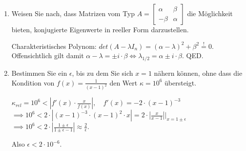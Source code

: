 \documentclass[12pt]{article}
\begin{document}
\begin{enumerate}
	\item Weisen Sie nach, dass Matrizen vom Typ $A = \begin{bmatrix} \alpha & \beta \\ -\beta & \alpha \end{bmatrix}$ die  Möglichkeit bieten, konjugierte Eigenwerte in reeller Form darzustellen.
	
	\begin{solution}
		Charakteristisches Polynom: $det(A-\lambda I_n) = (\alpha - \lambda)^2 +\beta^2 \stackrel{!}{=} 0$.\\
		Offensichtlich gilt damit $\alpha-\lambda = \pm i\cdot \beta \iff \lambda_{1/2} = \alpha \pm i\cdot \beta$.
		QED.		
	\end{solution}
	
\pagebreak

	\item Bestimmen Sie ein $\epsilon$, bis zu dem Sie sich $x=1$ nähern können, ohne dass die Kondition von $f(x) = \frac{1}{(x-1)^2}$ den Wert $\kappa = 10^6$ übersteigt.
	
	\begin{solution}
	
	$\kappa_{rel} = 10^6 < | f'(x) \cdot \frac{x}{f(x)} |,\quad f'(x) = -2\cdot (x-1)^{-3}$\\
	$\implies 10^6 < 2\cdot |(x-1)^{-3} \cdot (x-1)^2 \cdot x| = 2\cdot 
	|\frac{x}{x-1}| |_{x=1\pm \epsilon}$\\
	$\implies 10^6 < 2\cdot|\frac{1\pm \epsilon}{1\pm \epsilon - 1}| \approx \frac{2}{\epsilon}$.
	
	Also $\epsilon < 2 \cdot 10^{-6}$.
	\end{solution}
\end{enumerate}

\pagebreak

\newcommand{\raphsonFunction}{
	$f(x_1,x_2) = 
		\begin{bmatrix}
			x_1^2 + x_2\\ x_1x_2 + x_2^2
		\end{bmatrix}$}

\newcommand{\raphsonStartVal}{
	$\begin{bmatrix}x_{10} \\ x_{20}\end{bmatrix}
	= 
	\begin{bmatrix}1\\ -1\end{bmatrix}$}
\end{document}
